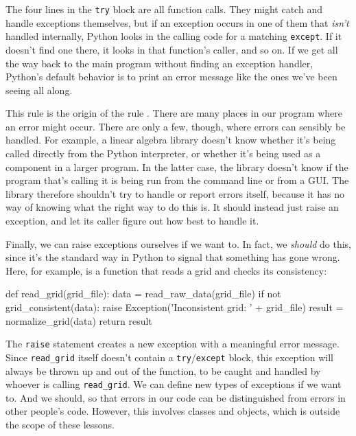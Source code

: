 The four lines in the \texttt{try} block are all function calls. They
might catch and handle exceptions themselves, but if an exception occurs
in one of them that \emph{isn't} handled internally, Python looks in the
calling code for a matching \texttt{except}. If it doesn't find one
there, it looks in that function's caller, and so on. If we get all the
way back to the main program without finding an exception handler,
Python's default behavior is to print an error message like the ones
we've been seeing all along.

This rule is the origin of the rule
. There
are many places in our program where an error might occur. There are
only a few, though, where errors can sensibly be handled. For example, a
linear algebra library doesn't know whether it's being called directly
from the Python interpreter, or whether it's being used as a component
in a larger program. In the latter case, the library doesn't know if the
program that's calling it is being run from the command line or from a
GUI. The library therefore shouldn't try to handle or report errors
itself, because it has no way of knowing what the right way to do this
is. It should instead just raise an exception, and let its caller figure
out how best to handle it.

Finally, we can raise exceptions ourselves if we want to. In fact, we
\emph{should} do this, since it's the standard way in Python to signal
that something has gone wrong. Here, for example, is a function that
reads a grid and checks its consistency:

\begin{VerbIn}
def read_grid(grid_file):
    data = read_raw_data(grid_file)
    if not grid_consistent(data):
        raise Exception('Inconsistent grid: ' + grid_file)
    result = normalize_grid(data)
    return result
\end{VerbIn}

The \texttt{raise} statement creates a new exception with a meaningful
error message. Since \texttt{read\_grid} itself doesn't contain a
\texttt{try}/\texttt{except} block, this exception will always be thrown
up and out of the function, to be caught and handled by whoever is
calling \texttt{read\_grid}. We can define new types of exceptions if we
want to. And we should, so that errors in our code can be distinguished
from errors in other people's code. However, this involves classes and
objects, which is outside the scope of these lessons.

